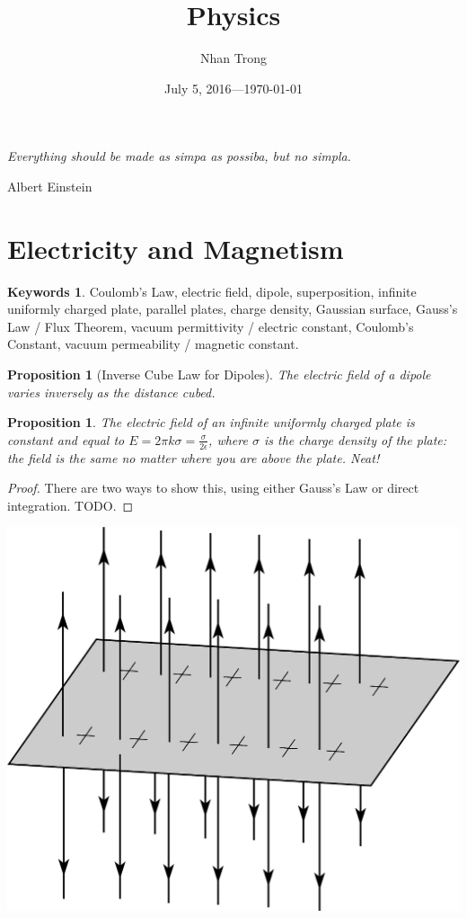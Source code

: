 \documentclass[12pt]{article}
\title{Physics}
\author{Nhan Trong}
\date{July 5, 2016---\today}                                           %
\theoremstyle{plain}
\newtheorem{proposition}[theorem]{Proposition}
\theoremstyle{definition}
\newtheorem*{keywords}{Keywords}
\theoremstyle{remark}
\begin{document}
\maketitle

\epigraph{\textit{Everything should be made as simpa as possiba, but no simpla.}}{Albert Einstein}

\part{Electricity and Magnetism}

\begin{keywords}
Coulomb's Law, electric field, dipole, superposition, infinite uniformly charged plate, parallel plates, charge density, Gaussian surface, Gauss's Law / Flux Theorem, vacuum permittivity / electric constant, Coulomb's Constant, vacuum permeability / magnetic constant.
\end{keywords}

\begin{proposition}[Inverse Cube Law for Dipoles]
The electric field of a dipole varies inversely as the distance cubed.
\end{proposition}

\begin{proposition}
The electric field of an infinite uniformly charged plate is constant and equal to $E = 2 \pi k \sigma = \frac{\sigma}{2 \epsilon}$, where $\sigma$ is the charge density of the plate: the field is the same no matter where you are above the plate. Neat!
\end{proposition}

\begin{proof}
There are two ways to show this, using either Gauss's Law or direct integration. TODO.
\end{proof}

\centerline{\includegraphics[width=1.0\textwidth]{infiniteplate}}
\end{document}
